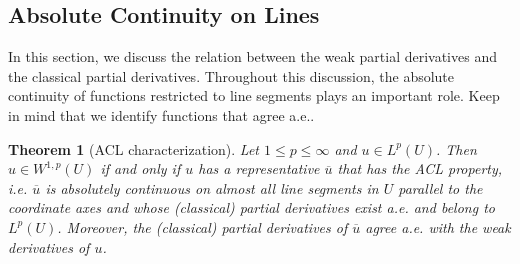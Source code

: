 \documentclass{article}
\numberwithin{equation}{section}
\newcommand{\ol}{\overline}
\theoremstyle{plain}
\newtheorem{theorem}{Theorem}[section]
\theoremstyle{definition}
\begin{document}
\subsection{Absolute Continuity on Lines} 
In this section, we discuss the relation between the weak partial derivatives and the classical partial derivatives. Throughout this discussion, the absolute continuity of functions restricted to line segments plays an important role. Keep in mind that we identify functions that agree a.e..

\begin{theorem}[ACL characterization]\label{ACLchar}
Let $1\leq p\leq\infty$ and $u\in L^p(U)$. Then $u\in W^{1,p}(U)$ if and only if $u$ has a representative $\ol{u}$ that has the ACL property, i.e. $\ol{u}$ is \emph{a}bsolutely \emph{c}ontinuous on almost all \emph{l}ine segments in $U$ parallel to the coordinate axes and whose (classical) partial derivatives exist a.e. and belong to $L^p(U)$. Moreover, the (classical)
partial derivatives of $\ol{u}$ agree a.e. with the weak derivatives of $u$.
\end{theorem}
\end{document}
